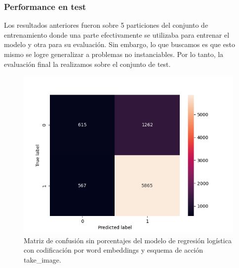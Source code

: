 \subsubsection{Performance en test}

Los resultados anteriores fueron sobre 5 particiones del conjunto de
entrenamiento donde una parte efectivamente se utilizaba para entrenar el modelo
y otra para su evaluación. Sin embargo, lo que buscamos es que esto mismo se
logre generalizar a problemas no instanciables. Por lo tanto, la evaluación
final la realizamos sobre el conjunto de test.

\begin{figure}
    \centering
    \includegraphics[scale=0.7]{figures/results/word_embeddings/lgr/take_image/lgr_set_6_confusion_matrix_raw.png}
    \caption{Matriz de confusión sin porcentajes del modelo de regresión logística con codificación por word embeddings y esquema de acción take\_image.}
    \label{fig:takeimage-bestmodel-cm-raw}
\end{figure}

